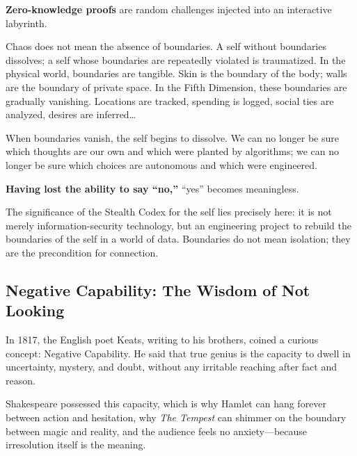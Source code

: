 \textbf{Zero-knowledge proofs} are random challenges injected into an interactive labyrinth.

\vspace{1em}

Chaos does not mean the absence of boundaries. A self without boundaries dissolves; a self whose boundaries are repeatedly violated is traumatized. In the physical world, boundaries are tangible. Skin is the boundary of the body; walls are the boundary of private space. In the Fifth Dimension, these boundaries are gradually vanishing. Locations are tracked, spending is logged, social ties are analyzed, desires are inferred\ldots



\vspace{1em}

When boundaries vanish, the self begins to dissolve. We can no longer be sure which thoughts are our own and which were planted by algorithms; we can no longer be sure which choices are autonomous and which were engineered.

\textbf{Having lost the ability to say ``no,''} ``yes'' becomes meaningless.

\vspace{1em}

The significance of the Stealth Codex for the self lies precisely here:
it is not merely information-security technology, but an engineering project to rebuild the boundaries of the self in a world of data.
Boundaries do not mean isolation; they are the precondition for connection.

\subsection{Negative Capability: The Wisdom of Not Looking}
In 1817, the English poet Keats, writing to his brothers, coined a curious concept: Negative Capability.
He said that true genius is the capacity to dwell in uncertainty, mystery, and doubt, without any irritable reaching after fact and reason.

\vspace{1em}

Shakespeare possessed this capacity, which is why Hamlet can hang forever between action and hesitation,
why \textit{The Tempest} can shimmer on the boundary between magic and reality, and the audience feels no anxiety---because irresolution itself is the meaning.

